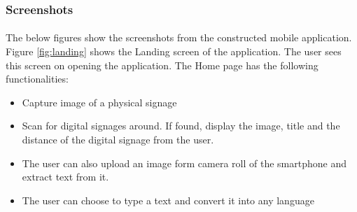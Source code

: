 \documentclass[12pt]{article}
\begin{document}
 
 \subsubsection{Screenshots}
 
\paragraph{}The below figures show the screenshots from the constructed mobile application. Figure \ref{fig:landing} shows the Landing screen of the application. The user sees this screen on opening the application. The Home page has the following functionalities: 

\begin{itemize}
	\item Capture image of a physical signage
	\item Scan for digital signages around. If found, display the image, title and the distance of the digital signage from the user.
	\item The user can also upload an image form camera roll of the smartphone and extract text from it. 
	\item The user can choose to type a text and convert it into any language
\end{itemize}
\end{document}
